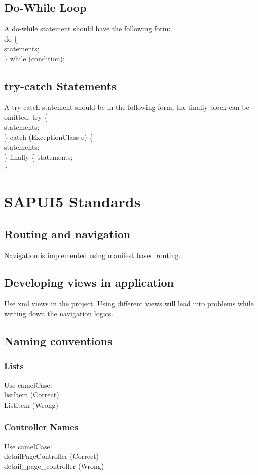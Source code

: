 \documentclass[a4paper,12pt]{report}
\begin{document}
\subsection{Do-While Loop}
A do-while statement should have the following form:\\
do \{ \\
	\indent statements; \\
\} while (condition); 
\subsection{try-catch Statements}
A try-catch statement should be in the following form, the finally block can be omitted. 
try \{ \\
	\indent statements;\\
\} catch (ExceptionClass e) \{ \\
	\indent statements;\\
\} finally \{
	\indent statements;\\
\}

\section{SAPUI5 Standards}
\subsection{Routing and navigation}
Navigation is implemented using manifest based routing.
\subsection{Developing views in application}
Use xml views in the project. Using different views will lead into problems while writing down the navigation logics.  
\subsection{Naming conventions}
	\subsubsection{Lists}
		Use camelCase:\\
		\indent listItem (Correct)\\
		\indent Listitem (Wrong)
	\subsubsection{Controller Names}
		Use camelCase:\\
		\indent	detailPageController (Correct)\\
		\indent	detail\_page\_controller (Wrong)
\end{document}
